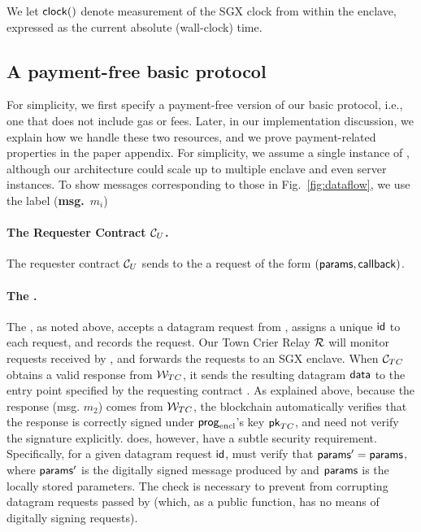We let ${{\sf clock}}()$ denote measurement of the SGX clock from within the enclave, expressed as the current absolute (wall-clock) time. 


\subsection{A payment-free basic protocol}
\label{sec:payment-free-protocol}

For simplicity, we first specify a payment-free version of our basic protocol, i.e., one that does not include gas or fees. Later, in our implementation discussion, we explain how we handle these two resources, and we prove payment-related properties in the paper appendix. For simplicity, we assume a single instance of \engine, although our architecture could scale up to multiple enclave and even server instances. To show messages corresponding to those in Fig.~\ref{fig:dataflow}, we use the label ({\bf msg.}~$m_i$)

\paragraph{The Requester Contract ${\cal C}_U$.}
The requester contract ${\cal C}_U$ sends to the \tcontract \tcont
a request of the form $({\sf params}, {\sf callback})$.

\paragraph{The \tcontract \tcont.} 
The \tcontract, as noted above, accepts a datagram request from \reqcont, 
assigns a unique ${\sf id}$ to each request, and
records the request.
Our Town Crier Relay $\mathcal{R}$ will monitor
requests received by \tcont, and 
forwards the requests to an SGX enclave.
When ${\cal C}_{TC}$ obtains a valid response
from ${\cal W}_{TC}$,   
it 
sends the resulting datagram ${\sf data}$ to the entry point \dgcallback 
specified by the requesting contract \reqcont. As explained above, because the response (msg. $m_2$) comes from ${\cal W}_{TC}$, the blockchain automatically verifies that the response is correctly signed under ${\sf prog}_{\textrm{encl}}$'s key ${\sf pk}_{TC}$, and \tcont need not verify the signature explicitly. \tc does, however, have a subtle security requirement. Specifically,  for a given datagram request ${\sf id}$, \tcont must verify that ${\sf params}' = {\sf params}$, where ${\sf params}'$ is the digitally signed message produced by \engine and ${\sf params}$ is the locally stored parameters. The check is necessary to prevent \relay from corrupting datagram requests passed by \tcont (which, as a public function, has no means of digitally signing requests). 

